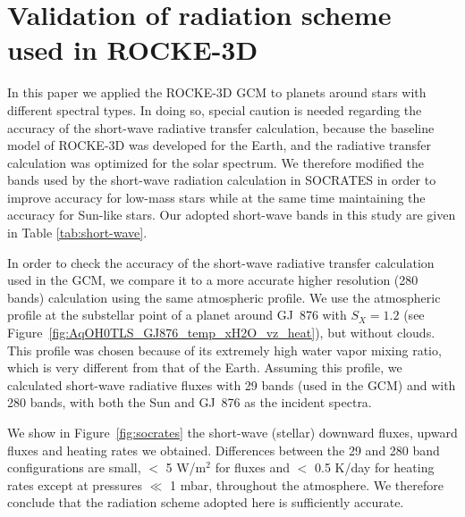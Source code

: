 \documentclass[11pt,numberedappendix,twocolappendix,]{emulateapj}
\def\modelE{ROCKE-3D}
\def\wv{water vapor}
\begin{document}
\section{Validation of radiation scheme\\used in \modelE{} }
\label{ap:radiation}

In this paper we applied the ROCKE-3D GCM to planets around stars with different spectral types. 
In doing so, special caution is needed regarding the accuracy of the short-wave radiative transfer calculation, because the baseline model of ROCKE-3D was  developed for the Earth, and the radiative transfer calculation was optimized for the solar spectrum. 
We therefore modified the bands used by the short-wave radiation calculation in SOCRATES in order to improve accuracy for low-mass stars while at the same time maintaining the accuracy for Sun-like stars.
Our adopted short-wave bands in this study are given in Table \ref{tab:short-wave}.

In order to check the accuracy of the short-wave radiative transfer calculation used in the GCM, we compare it to a more accurate higher resolution (280 bands) calculation using the same atmospheric profile. 
We use the atmospheric profile at the substellar point of a planet around GJ~876 with $S_X=1.2$ (see Figure~\ref{fig:AqOH0TLS_GJ876_temp_xH2O_vz_heat}), but without clouds. 
This profile was chosen because of its extremely high \wv{} mixing ratio, which is very different from that of the Earth. 
Assuming this profile, we calculated short-wave radiative fluxes with 29 bands (used in the GCM) and with 280 bands, with both the Sun and GJ~876 as the incident spectra.

We show in Figure~\ref{fig:socrates} the short-wave (stellar) downward fluxes, upward fluxes and heating rates we obtained.
Differences between the 29 and 280 band configurations are small, $<$ 5 W/m$^2$ for fluxes and $<$ 0.5 K/day for heating rates except at pressures $\ll$ 1 mbar, throughout the atmosphere. We therefore conclude that the radiation scheme adopted here is sufficiently accurate.
\end{document}
